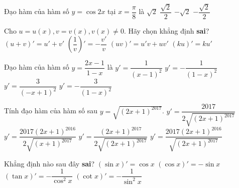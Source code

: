 \begin{ex}%
	Đạo hàm của hàm số $ y=\cos 2x $ tại $ x=\dfrac{\pi}{8} $ là
	\choice
	{$\sqrt{2}$}
	{$\dfrac{\sqrt{2}}{2}$}
	{\True $-\sqrt{2}$}
	{$-\dfrac{\sqrt{2}}{2}$}
\end{ex}

\begin{ex}%
	Cho $ u=u(x), v=v(x), v(x)\ne 0 $. Hãy chọn khẳng định \textbf{sai}?
	\choice
	{$(u+v)'=u'+v'$}
	{\True $\left(\dfrac{1}{v}\right)'=-\dfrac{v'}{v}$}
	{$(uv)'=u'v+uv'$}
	{$(ku)'=ku'$}
\end{ex}



\begin{ex}%
	Đạo hàm của hàm số $ y=\dfrac{2x-1}{1-x} $ là
	\choice
	{\True $y'=\dfrac{1}{(x-1)^2}$}
	{$y'=-\dfrac{1}{(1-x)^2}$}
	{$y'=\dfrac{3}{(-x+1)^2}$}
	{$y'=-\dfrac{3}{(1-x)^2}$}
\end{ex}

\begin{ex}%
	Tính đạo hàm của hàm số sau $ y=\sqrt{(2x+1)^{2017}}$.
	\choice
	{$y'=\dfrac{2017}{2\sqrt{(2x+1)^{2017}}}$}
	{$y'=\dfrac{2017(2x+1)^{2016}}{2\sqrt{(x+1)^{2017}}}$}
	{$y'=\dfrac{(2x+1)^{2017}}{2\sqrt{(2x+1)^{2017}}}$}
	{\True $y'=\dfrac{2017(2x+1)^{2016}}{\sqrt{(2x+1)^{2017}}}$}
\end{ex}


\begin{ex}%
	Khẳng định nào sau đây  \textbf{sai}?
	\choice
	{$(\sin x)'=\cos x$}
	{$(\cos x)'=-\sin x$}
	{\True $(\tan x)'=-\dfrac{1}{\cos^2x}$}
	{$(\cot x)'=-\dfrac{1}{\sin^2x}$}
\end{ex}




